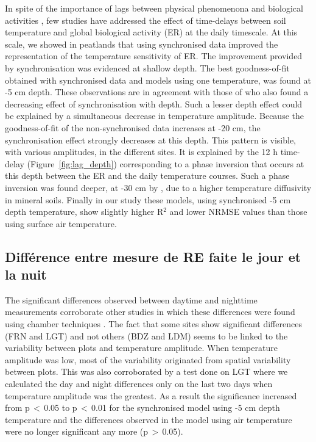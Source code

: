 In spite of the importance of lags between physical phenomenona and biological activities \citep{vargas2010}, few studies have addressed the effect of time-delays between soil temperature and global biological activity (ER) at the daily timescale.
At this scale, we showed in peatlands that using synchronised data improved the representation of the temperature sensitivity of ER.
The improvement provided by synchronisation was evidenced at shallow depth.
The best goodness-of-fit obtained with synchronised data and models using one temperature, was found at -5 cm depth.
These observations are in agreement with those of \citet{pavelka2007} who also found a decreasing effect of synchronisation with depth.
Such a lesser depth effect could be explained by a simultaneous decrease in temperature amplitude.
Because the goodness-of-fit of the non-synchronised data increases at -20 cm, the synchronisation effect  strongly decreases at this depth.
This pattern is visible, with various amplitudes, in the different sites.
It is explained by the 12 h time-delay (Figure~\ref{fig:lag_depth}) corresponding to a phase inversion that occurs at this depth between the ER and the daily temperature courses.
Such a phase inversion was found deeper, at -30 cm by \citet{pavelka2007}, due to a higher temperature diffusivity in mineral soils.
Finally in our study these models, using synchronised -5 cm depth temperature, show slightly higher R$^2$ and lower NRMSE values than those using surface air temperature.

\subsection{Différence entre mesure de RE faite le jour et la nuit}


The significant differences observed between daytime and nighttime measurements corroborate other studies in which these differences were found using chamber techniques \citep{juszczak2012,darenova2014}.
The fact that some sites show significant differences (FRN and LGT) and not others (BDZ and LDM) seems to be linked to the variability between plots and temperature amplitude.
When temperature amplitude was low, most of the variability originated from spatial variability between plots.
This was also corroborated by a test done on LGT where we calculated the day and night differences only on the last two days when temperature amplitude was the greatest.
As a result the significance increased from p\,$<$\,0.05 to p\,$<$\,0.01 for the synchronised model using -5 cm depth temperature and the differences observed in the model using air temperature were no longer significant any more (p\,$>$\,0.05).



